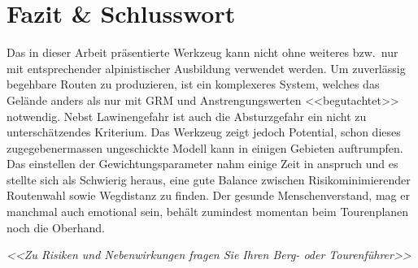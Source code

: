 \section{Fazit \& Schlusswort}

Das in dieser Arbeit präsentierte Werkzeug kann nicht ohne weiteres bzw.\ nur mit entsprechender alpinistischer Ausbildung verwendet werden. Um zuverlässig begehbare Routen zu produzieren, ist ein komplexeres System, welches das Gelände anders als nur mit GRM und Anstrengungswerten <<begutachtet>> notwendig. Nebst Lawinengefahr ist auch die Absturzgefahr ein nicht zu unterschätzendes Kriterium. Das Werkzeug zeigt jedoch Potential, schon dieses zugegebenermassen ungeschickte Modell kann in einigen Gebieten auftrumpfen. Das einstellen der Gewichtungsparameter nahm einige Zeit in anspruch und es stellte sich als Schwierig heraus, eine gute Balance zwischen Risikominimierender Routenwahl sowie Wegdistanz zu finden. Der gesunde Menschenverstand, mag er manchmal auch emotional sein, behält zumindest momentan beim Tourenplanen noch die Oberhand.

\large{
  \textit{<<Zu Risiken und Nebenwirkungen fragen Sie Ihren Berg- oder Tourenführer>>}
}